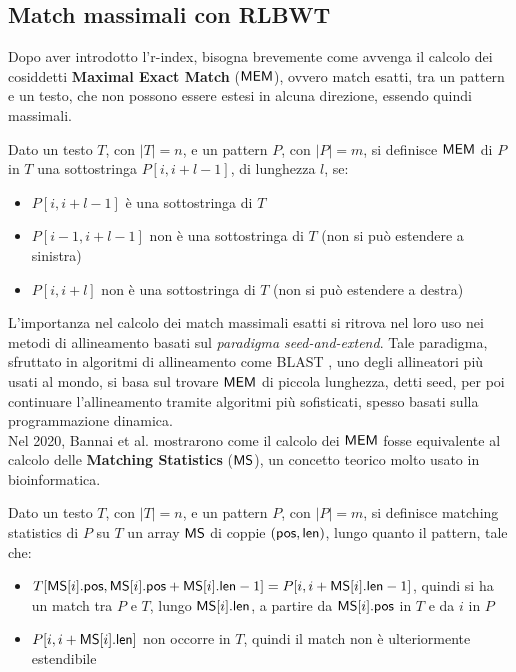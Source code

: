 \subsection{Match massimali con RLBWT}
Dopo aver introdotto l'r-index, bisogna brevemente come avvenga il
calcolo dei cosiddetti \textbf{Maximal Exact Match} ($\mbox{\rm {\sf MEM}}$), ovvero match
esatti, tra un pattern e un testo, che non 
possono essere estesi in alcuna direzione, essendo quindi massimali.
\begin{definizione}
  Dato un testo $T$, con $|T|=n$, e un pattern $P$, con $|P|=m$, si definisce
  $\mbox{\rm {\sf MEM}}$ di $P$ in $T$ una sottostringa $P[i,i+l-1]$, di lunghezza $l$,
  se:
  \begin{itemize}
    \item $P[i,i+l-1]$ è una sottostringa di $T$
    \item $P[i-1,i+l-1]$ non è una sottostringa di $T$ (non si può estendere a
    sinistra) 
    \item $P[i,i+l]$ non è una sottostringa di $T$ (non si può estendere a
    destra) 
  \end{itemize}
\end{definizione}
L'importanza nel calcolo dei match massimali esatti si ritrova nel loro uso nei
metodi di allineamento basati sul \textit{paradigma seed-and-extend}.
Tale paradigma, sfruttato in algoritmi di allineamento come BLAST
\cite{blast}, uno degli allineatori più usati al mondo, si basa sul trovare
$\mbox{\rm {\sf MEM}}$ di piccola lunghezza, detti seed, per poi continuare
l'allineamento tramite algoritmi più sofisticati, spesso basati sulla
programmazione dinamica. \\
Nel 2020, Bannai et al. \cite{bannai} mostrarono come il calcolo dei
$\mbox{\rm {\sf MEM}}$ fosse equivalente al calcolo delle \textbf{Matching Statistics} ($\mbox{\rm {\sf MS}}$), 
un concetto teorico molto usato in
bioinformatica. 
\begin{definizione}
  Dato un testo $T$, con $|T|=n$, e un pattern $P$, con $|P|=m$, si definisce
  matching statistics di $P$ su $T$ un array $\mbox{\rm {\sf MS}}$ di coppie $(\mbox{\rm {\sf pos}},
  \mbox{\rm {\sf len}})$, lungo quanto il pattern, tale che:
  \begin{itemize}
    \item $T[\mbox{\rm {\sf MS}}[i].\mbox{\rm {\sf pos}},\mbox{\rm {\sf MS}}[i].\mbox{\rm {\sf pos}}+\mbox{\rm {\sf MS}}[i].\mbox{\rm {\sf len}}-1]=
    P[i,i+\mbox{\rm {\sf MS}}[i].\mbox{\rm {\sf len}}-1]$, quindi si ha
    un match tra $P$ e $T$, lungo $\mbox{\rm {\sf MS}}[i].\mbox{\rm {\sf len}}$, a partire da $\mbox{\rm {\sf MS}}[i].\mbox{\rm {\sf pos}}$ 
    in $T$ e da $i$ in $P$
    \item $P[i,i+\mbox{\rm {\sf MS}}[i].\mbox{\rm {\sf len}}]$ non occorre in $T$, quindi il match non è
    ulteriormente estendibile 
  \end{itemize}
\end{definizione}
